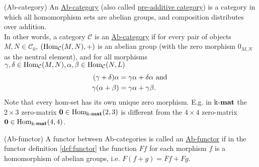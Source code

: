 \begin{definition}{(Ab-category)}
An \ul{Ab-category} (also called \ul{pre-additive category}) is a category in which all homomorphism sets are abelian groups,
and composition distributes over addition.\\
In other words, a category $\mathcal{C}$ is an \ul{Ab-category} if for every pair of objects $M,N \in \mathcal{C}_{0}$,
$( \textup{Hom}_{\mathcal{C}}(M,N), + )$ is an abelian group (with the zero morphism $0_{M,N}$ as the neutral element),
and for all morphisms $\gamma, \delta \in \textup{Hom}_{\mathcal{C}}(M,N),
\alpha, \beta \in \textup{Hom}_{\mathcal{C}}(N,L)$
\begin{align}
(\gamma + \delta)\alpha &=\label{eq:dist1} \gamma\alpha + \delta\alpha \textup{ and }\\
\gamma(\alpha+\beta) &=\label{eq:dist2} \gamma\alpha + \gamma\beta.
\end{align}
Note that every hom-set has its own unique zero morphism. E.g. in $\Bbbk\textnormal{-}\mathbf{mat}$ the $2 \times 3$ zero-matrix
$\mathbf{0} \in \textup{Hom}_{\Bbbk\textnormal{-}\mathbf{mat}}(2,3)$ is different from the $4 \times 4$ zero-matrix $\mathbf{0} \in \textup{Hom}_{\Bbbk\textnormal{-}\mathbf{mat}}(4,4)$.
\end{definition}

\begin{definition}{(Ab-functor)}
A functor between Ab-categories is called an \ul{Ab-functor} if in the functor definition \ref{def:functor} the function $Ff$ for each
morphism $f$ is a homomorphism of abelian groups, i.e. $F(f+g) = Ff + Fg$.
\end{definition}

